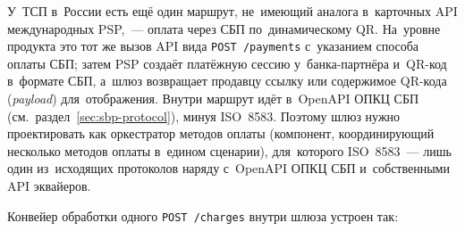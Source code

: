 У~ТСП в~России есть ещё один маршрут, не~имеющий аналога в~карточных API
международных PSP,~--- оплата через СБП по~динамическому QR. На~уровне продукта
это тот же вызов API вида \texttt{POST~/payments} с~указанием способа оплаты
СБП; затем PSP создаёт платёжную сессию у~банка-партнёра и~QR-код в~формате
СБП, а~шлюз возвращает продавцу ссылку или содержимое QR-кода (\textit{payload}) для~отображения. Внутри
маршрут идёт в~OpenAPI ОПКЦ СБП (см.~раздел~\ref{sec:sbp-protocol}), минуя
ISO~8583. Поэтому шлюз нужно проектировать как оркестратор методов
оплаты (компонент, координирующий несколько методов оплаты в~едином сценарии),
для~которого ISO~8583~--- лишь один из~исходящих протоколов наряду с~OpenAPI
ОПКЦ СБП и~собственными API эквайеров.

Конвейер обработки одного \texttt{POST~/charges} внутри шлюза устроен так:

